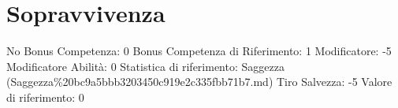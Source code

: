 \section{Sopravvivenza}\label{sopravvivenza}

\begin{description}
\tightlist
\item[Tags: ABI]
No Bonus Competenza: 0 Bonus Competenza di Riferimento: 1 Modificatore:
-5 Modificatore Abilità: 0 Statistica di riferimento: Saggezza
(Saggezza\%20bc9a5bbb3203450c919e2c335fbb71b7.md) Tiro Salvezza: -5
Valore di riferimento: 0
\end{description}
